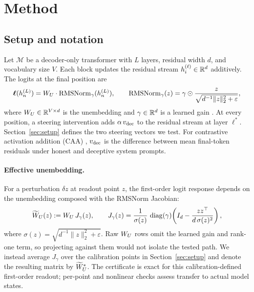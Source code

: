 \section{Method}\label{sec:method}

\subsection{Setup and notation}

Let $\mathcal{M}$ be a decoder-only transformer with $L$ layers, residual width $d$, and vocabulary size $V$. Each block updates the residual stream $h^{(\ell)}_i \in \mathbb{R}^d$ additively. The logits at the final position are
\begin{equation}
\bm{\ell}(h^{(L)}_n) = W_{U} \cdot \mathrm{RMSNorm}_\gamma(h^{(L)}_n),
\qquad
\mathrm{RMSNorm}_\gamma(z) = \gamma \odot \frac{z}{\sqrt{d^{-1}\|z\|_2^2 + \varepsilon}},
\label{eq:readout}
\end{equation}
where $W_{U} \in \mathbb{R}^{V \times d}$ is the unembedding and $\gamma \in \mathbb{R}^d$ is a learned gain \citep{zhang2019rmsnorm}. At every position, a steering intervention adds $\alpha\,v_{\mathrm{dec}}$ to the residual stream at layer $\ell^{*}$. Section~\ref{sec:setup} defines the two steering vectors we test. For contrastive activation addition (CAA) \citep{rimsky2024caa,zou2023repe}, $v_{\mathrm{dec}}$ is the difference between mean final-token residuals under honest and deceptive system prompts.

\paragraph{Effective unembedding.}
For a perturbation $\delta z$ at readout point $z$, the first-order logit response depends on the unembedding composed with the RMSNorm Jacobian:
\begin{equation}
\widetilde{W}_{U}(z) := W_{U} \, J_{\gamma}(z), \qquad
J_{\gamma}(z) = \frac{1}{\sigma(z)}\,\operatorname{diag}(\gamma)\!\left(I_d - \frac{z z^{\top}}{d\,\sigma(z)^2}\right),
\label{eq:effective}
\end{equation}
where $\sigma(z) = \sqrt{d^{-1}\|z\|_2^2+\varepsilon}$. Raw $W_{U}$ rows omit the learned gain and rank-one term, so projecting against them would not isolate the tested path. We instead average $J_{\gamma}$ over the calibration points in Section~\ref{sec:setup} and denote the resulting matrix by $\widetilde{W}_{U}^{*}$. The certificate is exact for this calibration-defined first-order readout; per-point and nonlinear checks assess transfer to actual model states.

